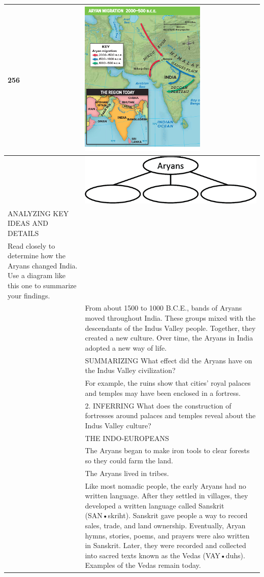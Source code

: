 \begin{longtable}{|>{\raggedleft}p{1.5cm}|p{8.5cm}|}
\hline
\vbox{\hbox{}\hbox{256}\hbox{\phantom{\rule{0pt}{4.6cm}}}} & \includegraphics[scale=0.5]{figures/chap4-fig1.png} \tabularnewline
\hline
251 & \centering\includegraphics[scale=0.5]{figures/chap4-fig2.png}\\ \raggedright ANALYZING KEY IDEAS AND DETAILS\\ Read closely to determine how the Aryans changed India. Use a diagram like this one to summarize your findings. \tabularnewline
\hline
255 & From about 1500 to 1000 B.C.E., bands of Aryans moved throughout India. These groups mixed with the descendants of the Indus Valley people. Together, they created a new culture. Over time, the Aryans in India adopted a new way of life. \tabularnewline
\hline
284 & SUMMARIZING What effect did the Aryans have on the Indus Valley civilization? \tabularnewline
\hline
254 & For example, the ruins show that cities’ royal palaces and temples may have been enclosed in a fortress. \tabularnewline
\hline
254 & 2. INFERRING What does the construction of fortresses around palaces and temples reveal about the Indus Valley culture? \tabularnewline
\hline
255 & THE INDO-EUROPEANS \tabularnewline
\hline
255 & The Aryans began to make iron tools to clear forests so they could farm the land. \tabularnewline
\hline
256 & The Aryans lived in tribes. \tabularnewline
\hline
256 & Like most nomadic people, the early Aryans had no written language. After they settled in villages, they developed a written language called Sanskrit (SAN•skriht). Sanskrit gave people a way to record sales, trade, and land ownership. Eventually, Aryan hymns, stories, poems, and prayers were also written in Sanskrit. Later, they were recorded and collected into sacred texts known as the Vedas (VAY•duhs). Examples of the Vedas remain today. \tabularnewline

\end{longtable}
